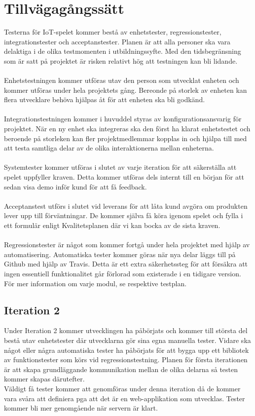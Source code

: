 \documentclass[10pt]{article}
\begin{document}
\section{Tillvägagångssätt}
	Testerna för IoT-spelet kommer bestå av enhetstester, regressionstester, integrationstester och acceptanstester. Planen är att alla personer ska vara delaktiga i de olika 		testmomenten i utbildningssyfte. Med den tidsbegränsning som är satt på projektet är risken relativt hög att testningen kan bli lidande. \\
	\\
	Enhetstestningen kommer utföras utav den person som utvecklat enheten och kommer utföras under hela projektets gång. Bereonde på storlek av enheten kan flera utvecklare behöva hjälpas åt för att enheten ska bli godkänd.\\
	\\
	Integrationstestningen kommer i huvuddel styras av konfigurationsansvarig för projektet. När en ny enhet ska integreras ska den först ha klarat enhetstestet och beroende på storleken kan fler projektmedlemmar kopplas in och hjälpa till med att testa samtliga delar av de olika interaktionerna mellan enheterna. \\
	\\
	Systemtester kommer utföras i slutet av varje iteration för att säkerställa att spelet uppfyller kraven. Detta kommer utföras dels internt till en början för att sedan visa demo inför kund för att få feedback.  \\ 
	\\
	Acceptanstest utförs i slutet vid leverans för att låta kund avgöra om produkten lever upp till förväntningar. De kommer själva få köra igenom spelet och fylla i ett formulär enligt Kvalitetsplanen där vi kan bocka av de sista kraven. \\
	\\
	Regressionstester är något som kommer fortgå under hela projektet med hjälp av automatisering. Automatiska tester kommer göras när nya delar läggs till på Github med hjälp av Travis. Detta är ett extra säkerhetssteg för att försäkra att ingen essentiell funktionalitet går förlorad som existerade i en tidigare version.\\
	För mer information om varje modul, se respektive testplan.
	
\subsection{Iteration 2}
	Under Iteration 2 kommer utvecklingen ha påbörjats och kommer till största del bestå utav enhetstester där utvecklarna gör sina egna manuella tester. Vidare ska något eller några automatiska tester ha påbörjats för att bygga upp ett bibliotek av funktionstester som körs vid regressionstestning. Planen för första iterationen är att skapa grundläggande kommunikation mellan de olika delarna så testen kommer skapas därutefter.
	\\
	Väldigt få tester kommer att genomföras under denna iteration då de kommer vara svåra att definiera pga att det är en web-applikation som utvecklas. Tester kommer bli mer genomgående när servern är klart.
	
\end{document}
